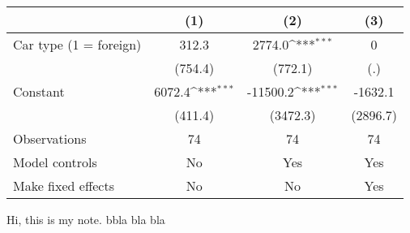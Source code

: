 {
\def\sym#1{\ifmmode^{#1}\else\(^{#1}\)\fi}
\begin{tabular}{l*{3}{c}}
\hline\hline
                &\multicolumn{1}{c}{(1)}         &\multicolumn{1}{c}{(2)}         &\multicolumn{1}{c}{(3)}         \\
\hline
Car type (1 = foreign)&    312.3         &   2774.0\sym{***}&        0         \\
                &  (754.4)         &  (772.1)         &      (.)         \\
[1em]
Constant        &   6072.4\sym{***}& -11500.2\sym{***}&  -1632.1         \\
                &  (411.4)         & (3472.3)         & (2896.7)         \\
\hline
Observations    &       74         &       74         &       74         \\
Model controls  &       No         &      Yes         &      Yes         \\
Make fixed effects&       No         &       No         &      Yes         \\
\hline\hline \end{tabular}} \begin{tablenotes} \footnotesize \item Hi, this is my note. bbla bla bla  \end{tablenotes}
